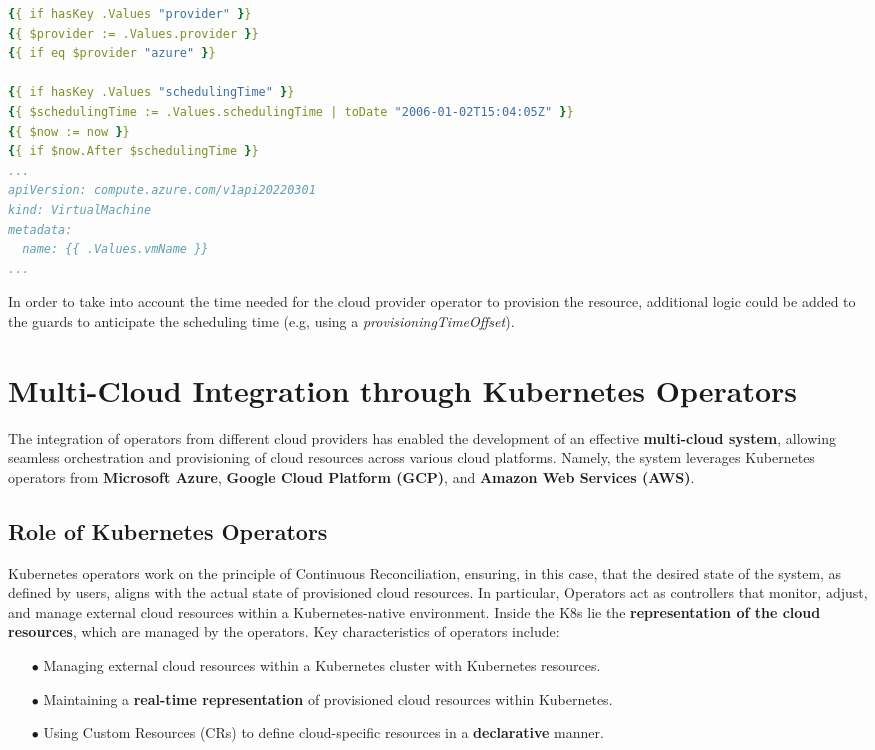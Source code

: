 \begin{lstlisting}[language=yaml, caption={Scheduling time}, label={lst:sched}]
{{ if hasKey .Values "provider" }}
{{ $provider := .Values.provider }}
{{ if eq $provider "azure" }}

{{ if hasKey .Values "schedulingTime" }}
{{ $schedulingTime := .Values.schedulingTime | toDate "2006-01-02T15:04:05Z" }}
{{ $now := now }}
{{ if $now.After $schedulingTime }}
...
apiVersion: compute.azure.com/v1api20220301
kind: VirtualMachine
metadata:
  name: {{ .Values.vmName }}
...
\end{lstlisting}

In order to take into account the time needed for the cloud provider operator to provision the resource, additional logic could be added to the guards to anticipate the scheduling time (e.g, using a \textit{provisioningTimeOffset}).

\section{Multi-Cloud Integration through Kubernetes Operators}

The integration of operators from different cloud providers has enabled the development of an effective \textbf{multi-cloud system}, allowing seamless orchestration and provisioning of cloud resources across various cloud platforms. Namely, the system leverages Kubernetes operators from \textbf{Microsoft Azure}, \textbf{Google Cloud Platform (GCP)}, and \textbf{Amazon Web Services (AWS)}.

\subsection{Role of Kubernetes Operators}

Kubernetes operators work on the principle of Continuous Reconciliation, ensuring, in this case, that the desired state of the system, as defined by users, aligns with the actual state of provisioned cloud resources. In particular, Operators act as controllers that monitor, adjust, and manage external cloud resources within a Kubernetes-native environment. Inside the K8s lie the \textbf{representation of the cloud resources}, which are managed by the operators.
Key characteristics of operators include:
\begin{itemize}[itemsep=0.2pt, topsep=1pt]
  \item[$\bullet$] Managing external cloud resources within a Kubernetes cluster with Kubernetes resources.
  \item[$\bullet$] Maintaining a \textbf{real-time representation} of provisioned cloud resources within Kubernetes.
  \item[$\bullet$] Using Custom Resources (CRs) to define cloud-specific resources in a \textbf{declarative} manner.
\end{itemize}

